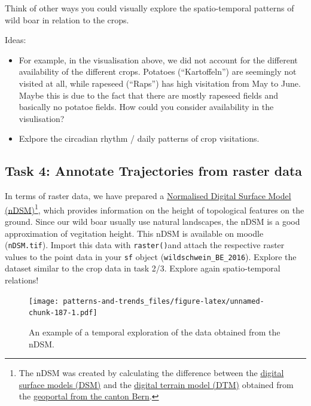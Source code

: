 \documentclass[]{book}
\providecommand{\tightlist}{%
  \setlength{\itemsep}{0pt}\setlength{\parskip}{0pt}}
\let\rmarkdownfootnote\footnote%
\def\footnote{\protect\rmarkdownfootnote}
\begin{document}
Think of other ways you could visually explore the spatio-temporal
patterns of wild boar in relation to the crops.

Ideas:

\begin{itemize}
\tightlist
\item
  For example, in the visualisation above, we did not account for the
  different availability of the different crops. Potatoes
  (``Kartoffeln'') are seemingly not visited at all, while rapeseed
  (``Raps'') has high visitation from May to June. Maybe this is due to
  the fact that there are mostly rapeseed fields and basically no
  potatoe fields. How could you consider availability in the
  visulisation?
\item
  Exlpore the circadian rhythm / daily patterns of crop visitations.
\end{itemize}

\subsection{Task 4: Annotate Trajectories from raster
data}\label{task-4-annotate-trajectories-from-raster-data}

In terms of raster data, we have prepared a
\href{https://gisgeography.com/lidar-light-detection-and-ranging/}{Normalised
Digital Surface Model (nDSM)}\footnote{The nDSM was created by
  calculating the difference between the
  \href{https://www.geo.apps.be.ch/de/geodaten/suche-nach-geodaten.html?view=sheet\&guid=094ce943-6ad7-4f07-aa9f-d8eb17c5cb38\&catalog=geocatalog\&type=complete\&preview=search_list}{digital
  surface models (DSM)} and the
  \href{https://www.geo.apps.be.ch/de/geodaten/suche-nach-geodaten.html?view=sheet\&guid=490de97b-8932-4ef7-9d13-e89ef41eeb4b\&catalog=geocatalog\&type=complete\&preview=search_list}{digital
  terrain model (DTM)} obtained from the
  \href{https://www.geo.apps.be.ch/de/geodaten/suche-nach-geodaten.html}{geoportal
  from the canton Bern}.}, which provides information on the height of
topological features on the ground. Since our wild boar usually use
natural landscapes, the nDSM is a good approximation of vegitation
height. This nDSM is available on moodle (\texttt{nDSM.tif}). Import
this data with \texttt{raster()}and attach the respective raster values
to the point data in your \texttt{sf} object
(\texttt{wildschwein\_BE\_2016}). Explore the dataset similar to the
crop data in task 2/3. Explore again spatio-temporal relations!

\begin{figure}
\centering
\texttt{[image: patterns-and-trends\_files/figure-latex/unnamed-chunk-187-1.pdf]}
\caption{\label{fig:unnamed-chunk-187}An example of a temporal exploration
of the data obtained from the nDSM.}
\end{figure}
\end{document}
